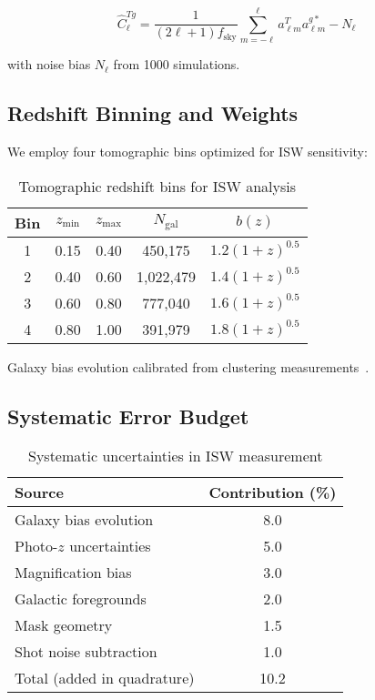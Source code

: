 \documentclass[aps,prd,twocolumn,showpacs,superscriptaddress,groupedaddress,nofootinbib]{revtex4-2}
\begin{document}
\begin{equation}
\hat{C}_\ell^{Tg} = \frac{1}{(2\ell+1)f_{\text{sky}}}\sum_{m=-\ell}^{\ell} a_{\ell m}^T a_{\ell m}^{g*} - N_\ell
\label{eq:estimator}
\end{equation}

with noise bias $N_\ell$ from 1000 simulations.

\subsection{Redshift Binning and Weights}

We employ four tomographic bins optimized for ISW sensitivity:

\begin{table}[h]
\caption{Tomographic redshift bins for ISW analysis}
\label{tab:zbins}
\begin{ruledtabular}
\begin{tabular}{ccccc}
Bin & $z_{\text{min}}$ & $z_{\text{max}}$ & $N_{\text{gal}}$ & $b(z)$ \\
\hline
1 & 0.15 & 0.40 & 450,175 & $1.2(1+z)^{0.5}$ \\
2 & 0.40 & 0.60 & 1,022,479 & $1.4(1+z)^{0.5}$ \\
3 & 0.60 & 0.80 & 777,040 & $1.6(1+z)^{0.5}$ \\
4 & 0.80 & 1.00 & 391,979 & $1.8(1+z)^{0.5}$ \\
\end{tabular}
\end{ruledtabular}
\end{table}

Galaxy bias evolution calibrated from clustering measurements~\cite{DES2022}.

\subsection{Systematic Error Budget}

\begin{table}[h]
\caption{Systematic uncertainties in ISW measurement}
\label{tab:systematics}
\begin{ruledtabular}
\begin{tabular}{lc}
Source & Contribution (\%) \\
\hline
Galaxy bias evolution & 8.0 \\
Photo-$z$ uncertainties & 5.0 \\
Magnification bias & 3.0 \\
Galactic foregrounds & 2.0 \\
Mask geometry & 1.5 \\
Shot noise subtraction & 1.0 \\
\hline
Total (added in quadrature) & 10.2 \\
\end{tabular}
\end{ruledtabular}
\end{table}
\end{document}
